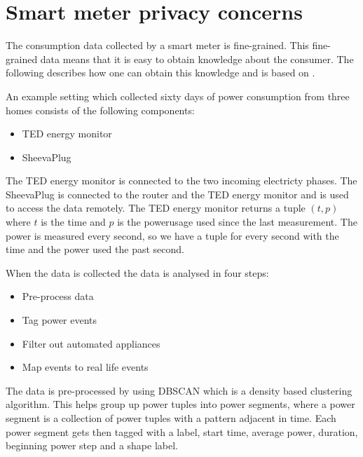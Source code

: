 \section{Smart meter privacy concerns}
The consumption data collected by a smart meter is fine-grained.
This fine-grained data means that it is easy to obtain knowledge about the consumer.
The following describes how one can obtain this knowledge and is based on \citet{privacy_memoir}.


An example setting which collected sixty days of power consumption from three homes consists of the following components:
\begin{itemize}
\item TED energy monitor
\item SheevaPlug
\end{itemize}
The TED energy monitor is connected to the two incoming electricty phases.
The SheevaPlug is connected to the router and the TED energy monitor and is used to access the data remotely.
The TED energy monitor returns a tuple $(t,p)$ where $t$ is the time and $p$ is the powerusage used since the last measurement.
The power is measured every second, so we have a tuple for every second with the time and the power used the past second.

When the data is collected the data is analysed in four steps:
\begin{itemize}
\item Pre-process data
\item Tag power events
\item Filter out automated appliances
\item Map events to real life events
\end{itemize}

The data is pre-processed by using DBSCAN which is a density based clustering algorithm.
This helps group up power tuples into power segments, where a power segment is a collection of power tuples with a pattern adjacent in time.
Each power segment gets then tagged with a label, start time, average power, duration, beginning power step and a shape label.
